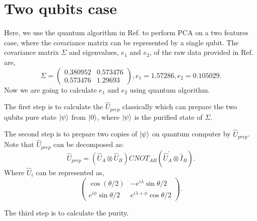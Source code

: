 \documentclass[a4paper]{article}
\begin{document}
\section{Two qubits case}
\label{sec:2qcase}
Here, we use the quantum algorithm in Ref.\cite{coles2018quantum} to perform PCA on a two features case, where the covariance matrix can be  represented by a single qubit. The covariance matrix $\Sigma$ and eigenvalues, $e_1$ and $e_2$, of the raw data provided in Ref.\cite{coles2018quantum} are,
\begin{equation} \label{eq:eq3}
	\Sigma = 
	\begin {pmatrix}
		0.380952   &   0.573476 \\
		0.573476   &   1.29693
	\end {pmatrix},
	e_1   =   1.57286,
	e_2   =   0.105029.
\end{equation}
Now we are going to calculate $e_1$ and $e_2$ using quantum algorithm. 

The first step is to calculate the $\hat{U}_{prep}$ classically which can prepare the two qubits pure state $\ket{\psi}$ from $\ket{0}$, where $\ket{\psi}$ is the purified state of $\Sigma$.

The second step is to prepare two copies of $\ket{\psi}$ on quantum computer by $\hat{U}_{prep}$. Note that $\hat{U}_{prep}$ can be decomposed as:
\begin{equation} \label{eq:eq4}
	\hat{U}_{prep}   =   (\hat{U}_A \otimes \hat{U}_B)   CNOT_{AB}   (\hat{U}_A^{\prime} \otimes \hat{I}_B).
\end{equation}
Where $\hat{U}_i$ can be represented as,
\begin{equation} \label{eq:eq5}
	\begin {pmatrix}
		\cos(\theta/2)   &   -e^{i \lambda} \sin{\theta/2} \\
		e^{i \phi} \sin{\theta/2}   &   e^{i \lambda + \phi} \cos{\theta/2}
	\end {pmatrix}.
\end{equation}

The third step is to calculate the purity.




\end{document}
